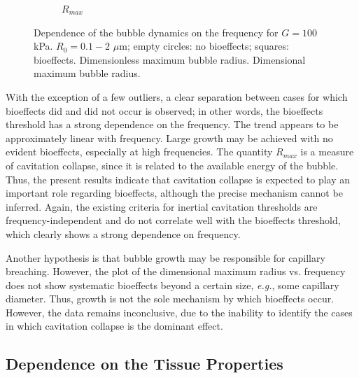 \begin{figure}[t]
\begin{subfigure}{0.47\textwidth}
    \caption[Dependence of maximum dimensional bubble radius on pulse frequency]{$R_{max}$}
    \label{fig:usbe_bubble_dradius_frequency}
  \end{subfigure}  
  \caption[Dependence of the bubble dynamics on the frequency for
    $G=100$ kPa]{Dependence of the bubble dynamics on the frequency for
    $G=100$ kPa. $R_0=0.1-2$ $\mu$m; empty circles: no bioeffects;
    squares: bioeffects. 
    Dimensionless maximum bubble
    radius.  Dimensional
    maximum bubble radius.}
  \label{fig:freq}
\end{figure}

With the exception of a few outliers, a clear separation between cases
for which bioeffects did and did not occur is observed; in other
words, the bioeffects threshold has a strong dependence on the
frequency. The trend appears to be approximately linear with
frequency. Large growth may be achieved with no evident bioeffects,
especially at high frequencies. The quantity $R_{max}$ is a
measure of cavitation collapse, since it is related to the available
energy of the bubble. Thus, the present results indicate that
cavitation collapse is expected to play an important role regarding
bioeffects, although the precise mechanism cannot be inferred.  Again,
the existing criteria for inertial cavitation thresholds are
frequency-independent and do not correlate well with the bioeffects
threshold, which clearly shows a strong dependence on frequency.

Another hypothesis is that bubble growth may be responsible for
capillary breaching. However, the plot of the dimensional maximum
radius vs. frequency does not show systematic bioeffects beyond a
certain size, \emph{e.g.}, some capillary diameter. Thus, growth is
not the sole mechanism by which bioeffects occur. However, the data
remains inconclusive, due to the inability to identify the cases in
which cavitation collapse is the dominant effect.






\subsection{Dependence on the Tissue Properties}
\label{sec:usbe_bubble_tissue_properties}

